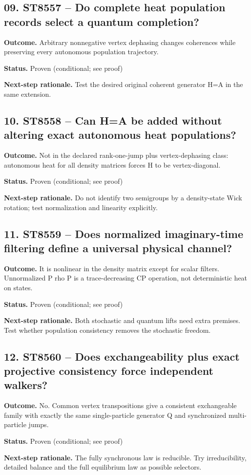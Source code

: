 \subsection*{09. ST8557 -- Do complete heat population records select a quantum completion?}
\noindent\textbf{Outcome.} Arbitrary nonnegative vertex dephasing changes coherences while preserving every autonomous population trajectory.\par
\noindent\textbf{Status.} Proven (conditional; see proof)\par
\noindent\textbf{Next-step rationale.} Test the desired original coherent generator H=A in the same extension.\par\medskip
\subsection*{10. ST8558 -- Can H=A be added without altering exact autonomous heat populations?}
\noindent\textbf{Outcome.} Not in the declared rank-one-jump plus vertex-dephasing class: autonomous heat for all density matrices forces H to be vertex-diagonal.\par
\noindent\textbf{Status.} Proven (conditional; see proof)\par
\noindent\textbf{Next-step rationale.} Do not identify two semigroups by a density-state Wick rotation; test normalization and linearity explicitly.\par\medskip
\subsection*{11. ST8559 -- Does normalized imaginary-time filtering define a universal physical channel?}
\noindent\textbf{Outcome.} It is nonlinear in the density matrix except for scalar filters. Unnormalized P rho P is a trace-decreasing CP operation, not deterministic heat on states.\par
\noindent\textbf{Status.} Proven (conditional; see proof)\par
\noindent\textbf{Next-step rationale.} Both stochastic and quantum lifts need extra premises. Test whether population consistency removes the stochastic freedom.\par\medskip
\subsection*{12. ST8560 -- Does exchangeability plus exact projective consistency force independent walkers?}
\noindent\textbf{Outcome.} No. Common vertex transpositions give a consistent exchangeable family with exactly the same single-particle generator Q and synchronized multi-particle jumps.\par
\noindent\textbf{Status.} Proven (conditional; see proof)\par
\noindent\textbf{Next-step rationale.} The fully synchronous law is reducible. Try irreducibility, detailed balance and the full equilibrium law as possible selectors.\par\medskip
